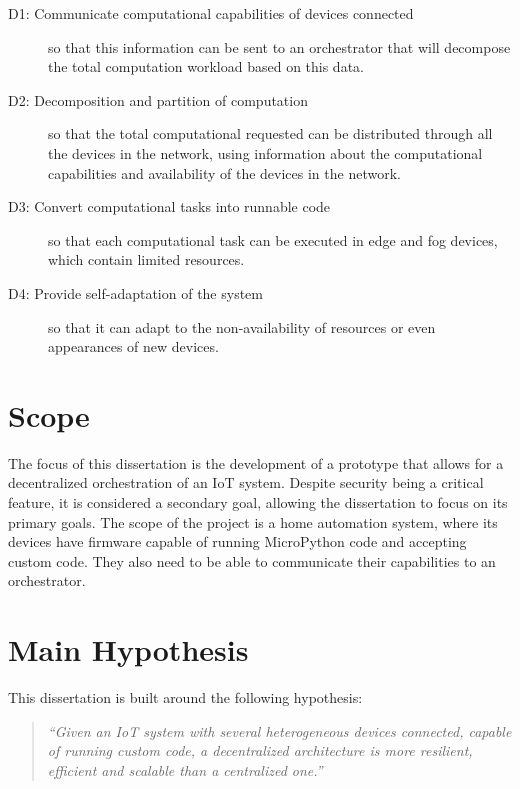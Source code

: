 \begin{description}
    \item [D1: Communicate computational capabilities of devices connected] so that this information can be sent to an orchestrator that will decompose the total computation workload based on this data.
    \item [D2: Decomposition and partition of computation] so that the total computational requested can be distributed through all the devices in the network, using information about the computational capabilities and availability of the devices in the network.
    \item [D3: Convert computational tasks into runnable code] so that each computational task can be executed in edge and fog devices, which contain limited resources.
    \item [D4: Provide self-adaptation of the system] so that it can adapt to the non-availability of resources or even appearances of new devices.
\end{description}

\section{Scope}\label{sec:scope}

The focus of this dissertation is the development of a prototype that allows for a decentralized orchestration of an IoT system. Despite security being a critical feature, it is considered a secondary goal, allowing the dissertation to focus on its primary goals. The scope of the project is a home automation system, where its devices have firmware capable of running  MicroPython code and accepting custom code. They also need to be able to communicate their capabilities to an orchestrator.


\section{Main Hypothesis}\label{sec:main_hypothesis}

This dissertation is built around the following hypothesis:

\begin{quote}
    \emph{``Given an IoT system with several heterogeneous devices connected, capable of running custom code, a decentralized architecture is more resilient, efficient and scalable than a centralized one.''}
\end{quote}

